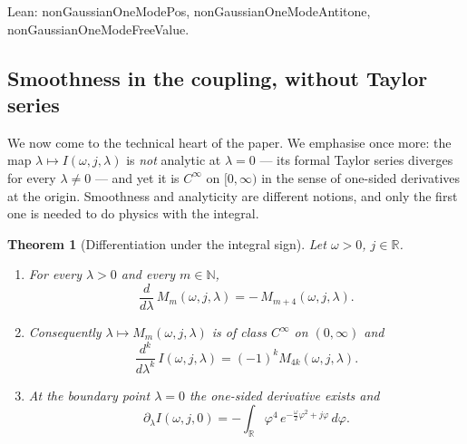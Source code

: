 \documentclass[11pt,a4paper]{article}
\theoremstyle{plain}
\newtheorem{theorem}{Theorem}[section]
\theoremstyle{definition}
\theoremstyle{remark}
\newcommand{\R}{\mathbb{R}}
\newcommand{\N}{\mathbb{N}}
\let\leanoldunderscore\_
\newcommand{\leanbreakunderscore}{\leanoldunderscore\allowbreak}
\newcommand{\lean}[1]{{\ttfamily\hyphenchar\font=-1\relax
  \let\_\leanbreakunderscore #1}}
\begin{document}
Lean: \lean{nonGaussianOneModePos}, \lean{nonGaussianOneModeAntitone},
\lean{nonGaussianOneModeFreeValue}.

\subsection{Smoothness in the coupling, without Taylor series}

We now come to the technical heart of the paper. We emphasise once more: the map
$\lambda\mapsto I(\omega,j,\lambda)$ is \emph{not} analytic at $\lambda=0$ --- its formal
Taylor series diverges for every $\lambda\neq0$ --- and yet it is $C^\infty$ on $[0,\infty)$
in the sense of one-sided derivatives at the origin. Smoothness and analyticity are
different notions, and only the first one is needed to do physics with the integral.

\begin{theorem}[Differentiation under the integral sign]
\label{thm:diff}
Let $\omega>0$, $j\in\R$.
\begin{enumerate}
\item For every $\lambda>0$ and every $m\in\N$,
\[
\frac{d}{d\lambda}\,M_m(\omega,j,\lambda)=-\,M_{m+4}(\omega,j,\lambda).
\]
\item Consequently $\lambda\mapsto M_m(\omega,j,\lambda)$ is of class $C^{\infty}$ on
$(0,\infty)$ and
\[
\frac{d^{k}}{d\lambda^{k}}\,I(\omega,j,\lambda)=(-1)^{k}M_{4k}(\omega,j,\lambda).
\]
\item At the boundary point $\lambda=0$ the one-sided derivative exists and
\begin{equation}
\label{eq:derzero}
\partial_\lambda I(\omega,j,0)
=-\int_\R \varphi^{4}\,e^{-\frac{\omega}{2}\varphi^{2}+j\varphi}\,d\varphi .
\end{equation}
\end{enumerate}
\end{theorem}
\end{document}
